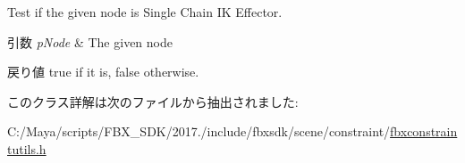 Test if the given node is Single Chain IK Effector. 
\begin{DoxyParams}{引数}
{\em p\+Node} & The given node \\
\hline
\end{DoxyParams}
\begin{DoxyReturn}{戻り値}
{\ttfamily true} if it is, {\ttfamily false} otherwise. 
\end{DoxyReturn}


このクラス詳解は次のファイルから抽出されました\+:\begin{DoxyCompactItemize}
\item 
C\+:/\+Maya/scripts/\+F\+B\+X\+\_\+\+S\+D\+K/2017./include/fbxsdk/scene/constraint/\hyperlink{fbxconstraintutils_8h}{fbxconstraintutils.\+h}\end{DoxyCompactItemize}
